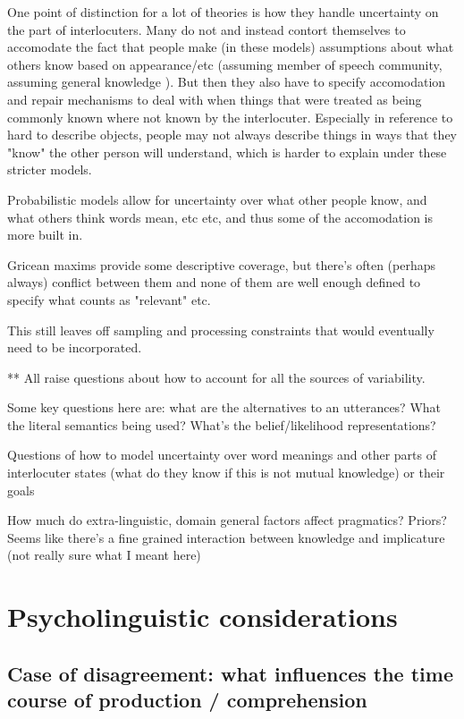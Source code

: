 \documentclass[]{article}
\begin{document}
One point of distinction for a lot of theories is how they handle uncertainty on the part of interlocuters. Many do not and instead contort themselves to accomodate the fact that people make (in these models) assumptions about what others know based on appearance/etc (assuming member of speech community, assuming general knowledge ). But then they also have to specify accomodation and repair mechanisms to deal with when things that were treated as being commonly known where not known by the interlocuter. Especially in reference to hard to describe objects, people may not always describe things in ways that they "know" the other person will understand, which is harder to explain under these stricter models. 

Probabilistic models allow for uncertainty over what other people know, and what others think words mean, etc etc, and thus some of the accomodation is more built in. 

Gricean maxims provide some descriptive coverage, but there's often (perhaps always) conflict between them and none of them are well enough defined to specify what counts as "relevant" etc. 

This still leaves off sampling and processing constraints that would eventually need to be incorporated.


** All raise questions about how to account for all the sources of variability. 

Some key questions here are: what are the alternatives to an utterances? What the literal semantics being used? What's the belief/likelihood representations? 


Questions of how to model uncertainty over word meanings and other parts of interlocuter states (what do they know if this is not mutual knowledge) or their goals

How much do extra-linguistic, domain general factors affect pragmatics? Priors? Seems like there's a fine grained interaction between knowledge and implicature (not really sure what I meant here)


\section{Psycholinguistic considerations}

\subsection{Case of disagreement: what influences the time course of production / comprehension }
\end{document}
